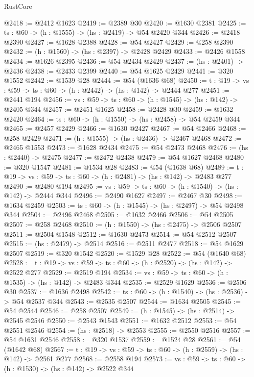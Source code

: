 \begin{lexlean}{RustCore}
\begin{coremodule}
@2418 := @2412 @1623
@2419 := @2389 @30
@2420 := @1630 @2381
@2425 := {ts : @60} -> (h : @1555) -> (hs : @2419) -> @54 @2420 @344
@2426 := @2418 @2390
@2427 := @1628 @2388
@2428 := @54 @2427
@2429 := @258 @2390
@2432 := (h : @1560) -> (hs : @2397) -> @2428 @2429
@2433 := @2426 @1558
@2434 := @1626 @2395
@2436 := @54 @2434 @2429
@2437 := (hs : @2401) -> @2436
@2438 := @2433 @2399
@2440 := @54 @1625 @2429
@2441 := @320 @1552
@2442 := @1539 @28
@2444 := @54 (@1636 @68)
@2450 := {t : @19} -> {vs : @59} -> {ts : @60} -> (h : @2442) -> (hs : @142) -> @2444 @277
@2451 := @2441 @194
@2456 := {vs : @59} -> {ts : @60} -> (h : @1545) -> (hs : @142) -> @2405 @344
@2457 := @2451 @1625
@2458 := @2428 @30
@2459 := @1632 @2420
@2464 := {ts : @60} -> (h : @1550) -> (hs : @2458) -> @54 @2459 @344
@2465 := @2457 @2429
@2466 := @1630 @2427
@2467 := @54 @2466
@2468 := @258 @2429
@2471 := (h : @1555) -> (hs : @2436) -> @2467 @2468
@2472 := @2465 @1553
@2473 := @1628 @2434
@2475 := @54 @2473 @2468
@2476 := (hs : @2440) -> @2475
@2477 := @2472 @2438
@2479 := @54 @1627 @2468
@2480 := @320 @1547
@2481 := @1534 @28
@2483 := @54 (@1638 @68)
@2489 := {t : @19} -> {vs : @59} -> {ts : @60} -> (h : @2481) -> (hs : @142) -> @2483 @277
@2490 := @2480 @194
@2495 := {vs : @59} -> {ts : @60} -> (h : @1540) -> (hs : @142) -> @2444 @344
@2496 := @2490 @1627
@2497 := @2467 @30
@2498 := @1634 @2459
@2503 := {ts : @60} -> (h : @1545) -> (hs : @2497) -> @54 @2498 @344
@2504 := @2496 @2468
@2505 := @1632 @2466
@2506 := @54 @2505
@2507 := @258 @2468
@2510 := (h : @1550) -> (hs : @2475) -> @2506 @2507
@2511 := @2504 @1548
@2512 := @1630 @2473
@2514 := @54 @2512 @2507
@2515 := (hs : @2479) -> @2514
@2516 := @2511 @2477
@2518 := @54 @1629 @2507
@2519 := @320 @1542
@2520 := @1529 @28
@2522 := @54 (@1640 @68)
@2528 := {t : @19} -> {vs : @59} -> {ts : @60} -> (h : @2520) -> (hs : @142) -> @2522 @277
@2529 := @2519 @194
@2534 := {vs : @59} -> {ts : @60} -> (h : @1535) -> (hs : @142) -> @2483 @344
@2535 := @2529 @1629
@2536 := @2506 @30
@2537 := @1636 @2498
@2542 := {ts : @60} -> (h : @1540) -> (hs : @2536) -> @54 @2537 @344
@2543 := @2535 @2507
@2544 := @1634 @2505
@2545 := @54 @2544
@2546 := @258 @2507
@2549 := (h : @1545) -> (hs : @2514) -> @2545 @2546
@2550 := @2543 @1543
@2551 := @1632 @2512
@2553 := @54 @2551 @2546
@2554 := (hs : @2518) -> @2553
@2555 := @2550 @2516
@2557 := @54 @1631 @2546
@2558 := @320 @1537
@2559 := @1524 @28
@2561 := @54 (@1642 @68)
@2567 := {t : @19} -> {vs : @59} -> {ts : @60} -> (h : @2559) -> (hs : @142) -> @2561 @277
@2568 := @2558 @194
@2573 := {vs : @59} -> {ts : @60} -> (h : @1530) -> (hs : @142) -> @2522 @344

\end{coremodule}
\end{lexlean}
